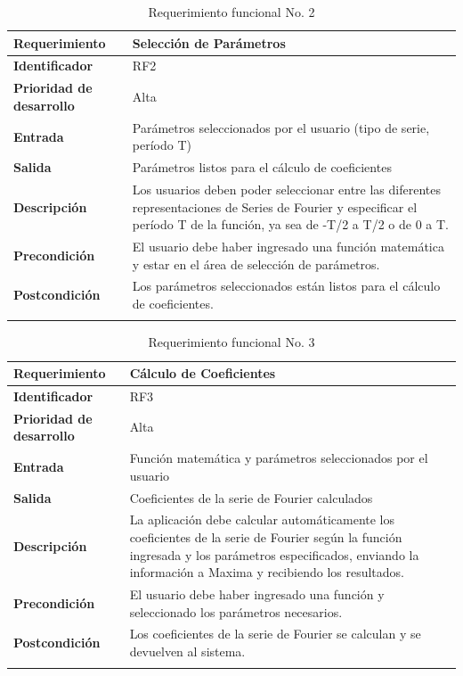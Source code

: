 \begin{longtable}{|m{3.5cm}|m{9.5cm}|}
	\hline
	\rowcolor{black!75} \color{white}\textbf{Requerimiento} & \color{white}\textbf{Selección de Parámetros} \\
	\hline
	\textbf{Identificador} & RF2 \\
	\hline
	\textbf{Prioridad de desarrollo} & Alta \\
	\hline
	\textbf{Entrada} & Parámetros seleccionados por el usuario (tipo de serie, período T) \\
	\hline
	\textbf{Salida} & Parámetros listos para el cálculo de coeficientes \\
	\hline
	\textbf{Descripción} & Los usuarios deben poder seleccionar entre las diferentes representaciones de Series de Fourier y especificar el período T de la función, ya sea de -T/2 a T/2 o de 0 a T. \\
	\hline
	\textbf{Precondición} & El usuario debe haber ingresado una función matemática y estar en el área de selección de parámetros. \\
	\hline
	\textbf{Postcondición} & Los parámetros seleccionados están listos para el cálculo de coeficientes. \\
	\hline
	\rowcolor{white} \caption{Requerimiento funcional No. 2} \label{tabla:RF2} \\
\end{longtable}


\begin{longtable}{|m{3.5cm}|m{9.5cm}|}
	\hline
	\rowcolor{black!75} \color{white}\textbf{Requerimiento} & \color{white}\textbf{Cálculo de Coeficientes} \\
	\hline
	\textbf{Identificador} & RF3 \\
	\hline
	\textbf{Prioridad de desarrollo} & Alta \\
	\hline
	\textbf{Entrada} & Función matemática y parámetros seleccionados por el usuario \\
	\hline
	\textbf{Salida} & Coeficientes de la serie de Fourier calculados \\
	\hline
	\textbf{Descripción} & La aplicación debe calcular automáticamente los coeficientes de la serie de Fourier según la función ingresada y los parámetros especificados, enviando la información a Maxima y recibiendo los resultados. \\
	\hline
	\textbf{Precondición} & El usuario debe haber ingresado una función y seleccionado los parámetros necesarios. \\
	\hline
	\textbf{Postcondición} & Los coeficientes de la serie de Fourier se calculan y se devuelven al sistema. \\
	\hline
	\rowcolor{white} \caption{Requerimiento funcional No. 3} \label{tabla:RF3} \\
\end{longtable}


